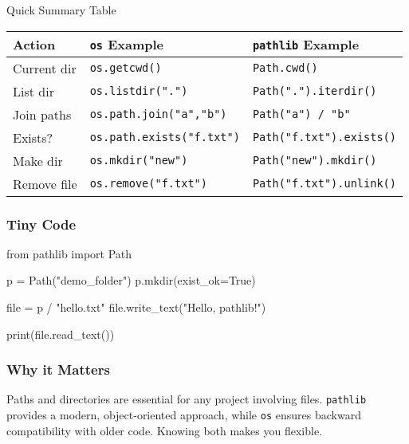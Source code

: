 \documentclass[
  letterpaper,
  DIV=11,
  numbers=noendperiod]{scrreprt}
\newenvironment{Shaded}{\begin{snugshade}}{\end{snugshade}}
\newcommand{\BuiltInTok}[1]{\textcolor[rgb]{0.00,0.23,0.31}{#1}}
\newcommand{\ImportTok}[1]{\textcolor[rgb]{0.00,0.46,0.62}{#1}}
\newcommand{\NormalTok}[1]{\textcolor[rgb]{0.00,0.23,0.31}{#1}}
\newcommand{\OperatorTok}[1]{\textcolor[rgb]{0.37,0.37,0.37}{#1}}
\newcommand{\StringTok}[1]{\textcolor[rgb]{0.13,0.47,0.30}{#1}}
\newcommand{\VariableTok}[1]{\textcolor[rgb]{0.07,0.07,0.07}{#1}}
\begin{document}
Quick Summary Table

\begin{longtable}[]{@{}lll@{}}
\toprule\noalign{}
Action & \texttt{os} Example & \texttt{pathlib} Example \\
\midrule\noalign{}
\endhead
\bottomrule\noalign{}
\endlastfoot
Current dir & \texttt{os.getcwd()} & \texttt{Path.cwd()} \\
List dir & \texttt{os.listdir(".")} & \texttt{Path(".").iterdir()} \\
Join paths & \texttt{os.path.join("a","b")} &
\texttt{Path("a")\ /\ "b"} \\
Exists? & \texttt{os.path.exists("f.txt")} &
\texttt{Path("f.txt").exists()} \\
Make dir & \texttt{os.mkdir("new")} & \texttt{Path("new").mkdir()} \\
Remove file & \texttt{os.remove("f.txt")} &
\texttt{Path("f.txt").unlink()} \\
\end{longtable}

\subsubsection{Tiny Code}\label{tiny-code-59}

\begin{Shaded}
\begin{Highlighting}[]
\ImportTok{from}\NormalTok{ pathlib }\ImportTok{import}\NormalTok{ Path}

\NormalTok{p }\OperatorTok{=}\NormalTok{ Path(}\StringTok{"demo\_folder"}\NormalTok{)}
\NormalTok{p.mkdir(exist\_ok}\OperatorTok{=}\VariableTok{True}\NormalTok{)}

\BuiltInTok{file} \OperatorTok{=}\NormalTok{ p }\OperatorTok{/} \StringTok{"hello.txt"}
\BuiltInTok{file}\NormalTok{.write\_text(}\StringTok{"Hello, pathlib!"}\NormalTok{)}

\BuiltInTok{print}\NormalTok{(}\BuiltInTok{file}\NormalTok{.read\_text())}
\end{Highlighting}
\end{Shaded}

\subsubsection{Why it Matters}\label{why-it-matters-59}

Paths and directories are essential for any project involving files.
\texttt{pathlib} provides a modern, object-oriented approach, while
\texttt{os} ensures backward compatibility with older code. Knowing both
makes you flexible.
\end{document}
